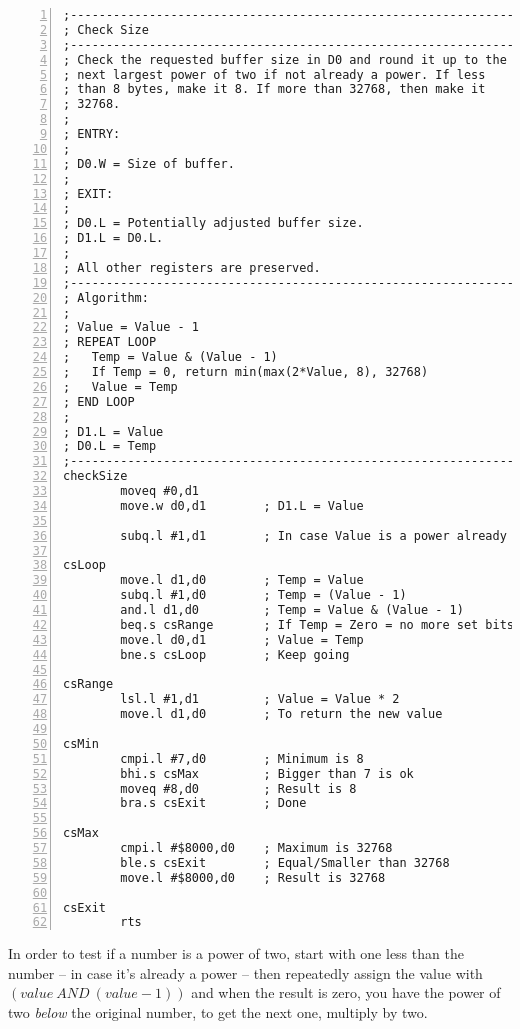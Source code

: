 \begin{lstlisting}[caption={Adjusting a buffer's size},label={lis:Adjusting-a-buffers-size},numbers=left,showstringspaces=false,tabsize=4]
;--------------------------------------------------------------
; Check Size
;--------------------------------------------------------------
; Check the requested buffer size in D0 and round it up to the
; next largest power of two if not already a power. If less 
; than 8 bytes, make it 8. If more than 32768, then make it 
; 32768.
; 
; ENTRY:
;
; D0.W = Size of buffer.
;
; EXIT:
;
; D0.L = Potentially adjusted buffer size.
; D1.L = D0.L.
;
; All other registers are preserved.
;--------------------------------------------------------------
; Algorithm:
;
; Value = Value - 1
; REPEAT LOOP
;   Temp = Value & (Value - 1)
;   If Temp = 0, return min(max(2*Value, 8), 32768)
;   Value = Temp
; END LOOP
;
; D1.L = Value
; D0.L = Temp
;--------------------------------------------------------------
checkSize
        moveq #0,d1
        move.w d0,d1        ; D1.L = Value

        subq.l #1,d1        ; In case Value is a power already

csLoop
        move.l d1,d0        ; Temp = Value
        subq.l #1,d0        ; Temp = (Value - 1)
        and.l d1,d0         ; Temp = Value & (Value - 1)
        beq.s csRange       ; If Temp = Zero = no more set bits
        move.l d0,d1        ; Value = Temp
        bne.s csLoop        ; Keep going

csRange
        lsl.l #1,d1         ; Value = Value * 2
        move.l d1,d0        ; To return the new value

csMin
        cmpi.l #7,d0        ; Minimum is 8
        bhi.s csMax         ; Bigger than 7 is ok
        moveq #8,d0         ; Result is 8
        bra.s csExit        ; Done

csMax
        cmpi.l #$8000,d0    ; Maximum is 32768
        ble.s csExit        ; Equal/Smaller than 32768
        move.l #$8000,d0    ; Result is 32768

csExit
        rts

\end{lstlisting}

In order to test if a number is a power of two, start with one less
than the number -- in case it's already a power -- then repeatedly
assign the value with $(value\ AND\ (value-1))$ and when the result
is zero, you have the power of two \emph{below} the original number,
to get the next one, multiply by two.

